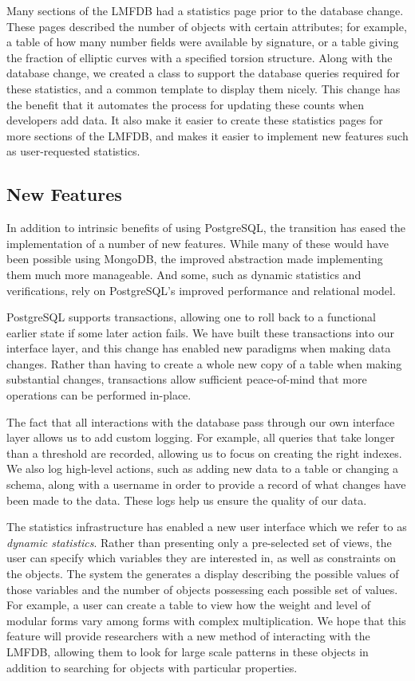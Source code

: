 \documentclass{article}
\begin{document}
Many sections of the LMFDB had a statistics page prior to the database change.
These pages described the number of objects with certain attributes; for example, a table of how many number fields were available by signature, or a table giving the fraction of elliptic curves with a specified torsion structure.
Along with the database change, we created a class to support the database queries required for these statistics, and a common template to display them nicely.
This change has the benefit that it automates the process for updating these counts when developers add data.
It also make it easier to create these statistics pages for more sections of the LMFDB, and makes it easier to implement new features such as user-requested statistics.

\subsection{New Features}

In addition to intrinsic benefits of using PostgreSQL, the transition has eased the implementation of a number of new features.
While many of these would have been possible using MongoDB, the improved abstraction made implementing them much more manageable.
And some, such as dynamic statistics and verifications, rely on PostgreSQL's improved performance and relational model.

PostgreSQL supports transactions, allowing one to roll back to a functional earlier state if some later action fails.
We have built these transactions into our interface layer, and this change has enabled new paradigms when making data changes.
Rather than having to create a whole new copy of a table when making substantial changes, transactions allow sufficient peace-of-mind that more operations can be performed in-place.

The fact that all interactions with the database pass through our own interface layer allows us to add custom logging.
For example, all queries that take longer than a threshold are recorded, allowing us to focus on creating the right indexes.
We also log high-level actions, such as adding new data to a table or changing a schema, along with a username in order to provide a record of what changes have been made to the data.
These logs help us ensure the quality of our data.

The statistics infrastructure has enabled a new user interface which we refer to as \emph{dynamic statistics}.
Rather than presenting only a pre-selected set of views, the user can specify which variables they are interested in, as well as constraints on the objects.
The system the generates a display describing the possible values of those variables and the number of objects possessing each possible set of values.
For example, a user can create a table to view how the weight and level of modular forms vary among forms with complex multiplication.
We hope that this feature will provide researchers with a new method of interacting with the LMFDB, allowing them to look for large scale patterns in these objects in addition to searching for objects with particular properties.
\end{document}
